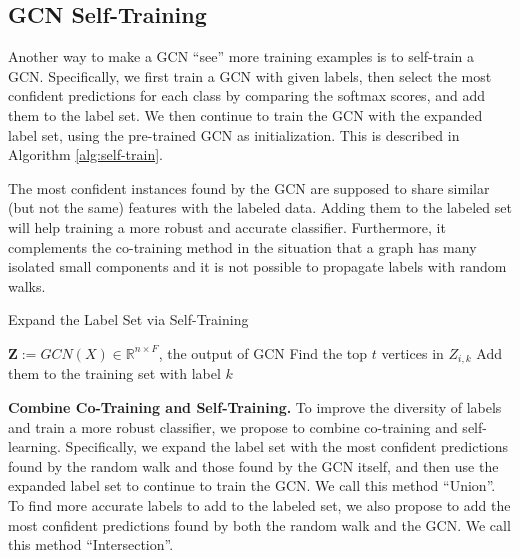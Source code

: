 \documentclass[letterpaper]{article} \usepackage{aaai18}  \usepackage{times}  \usepackage{helvet}  \usepackage{courier}  \usepackage{url}  \usepackage{graphicx}  \usepackage{algorithm}
\begin{document}
\subsection{GCN Self-Training}

Another way to make a GCN ``see'' more training examples is to self-train a GCN. Specifically, we first train a GCN with given labels, then select the most confident predictions for each class by comparing the softmax scores, and add them to the label set. We then continue to train the GCN with the expanded label set, using the pre-trained GCN as initialization. This is described in Algorithm \ref{alg:self-train}.



The most confident instances found by the GCN are supposed to share similar (but not the same) features with the labeled data. Adding them to the labeled set will help training a more robust and accurate classifier. Furthermore, it complements the co-training method in the situation that a graph has many isolated small components and it is not possible to propagate labels with random walks.

\begin{algorithm}
    \caption{Expand the Label Set via Self-Training}\label{alg:self-train}
    \label{parwalk}
    \begin{algorithmic}[1]
    \STATE $\bm Z:=GCN(X) \in \mathbb{R}^{n\times F}$, the output of GCN
    \STATE Find the top $t$ vertices in $Z_{i,k}$
\STATE Add them to the training set with label $k$
\ENDFOR
    \end{algorithmic}
\end{algorithm}





\textbf{Combine Co-Training and Self-Training.} To improve the diversity of labels and train a more robust classifier, we propose to combine co-training and self-learning. Specifically, we expand the label set with the most confident predictions found by the random walk and those found by the GCN itself, and then use the expanded label set to continue to train the GCN. We call this method ``Union''. To find more accurate labels to add to the labeled set, we also propose to add the most confident predictions found by both the random walk and the GCN. We call this method ``Intersection''.
\end{document}
